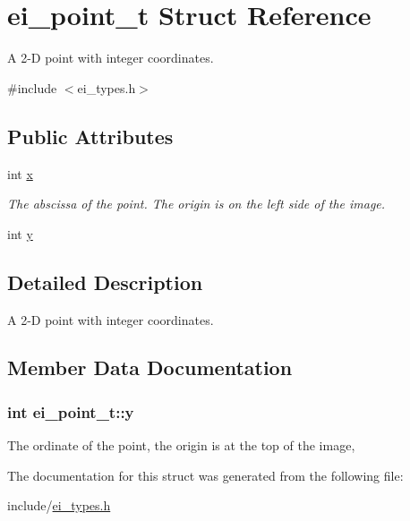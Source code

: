\hypertarget{structei__point__t}{}\section{ei\+\_\+point\+\_\+t Struct Reference}
\label{structei__point__t}


A 2-\/D point with integer coordinates.  




{\ttfamily \#include $<$ei\+\_\+types.\+h$>$}

\subsection*{Public Attributes}
\begin{DoxyCompactItemize}
\item 
int \hyperlink{structei__point__t_a6ec4a8846bae4b9694506dae039047b3}{x}\hypertarget{structei__point__t_a6ec4a8846bae4b9694506dae039047b3}{}\label{structei__point__t_a6ec4a8846bae4b9694506dae039047b3}

\begin{DoxyCompactList}\small\item\em The abscissa of the point. The origin is on the left side of the image. \end{DoxyCompactList}\item 
int \hyperlink{structei__point__t_a0c0f1bfa95c372595c52522877f556a0}{y}
\end{DoxyCompactItemize}


\subsection{Detailed Description}
A 2-\/D point with integer coordinates. 

\subsection{Member Data Documentation}
\subsubsection[{\texorpdfstring{y}{y}}]{\setlength{\rightskip}{0pt plus 5cm}int ei\+\_\+point\+\_\+t\+::y}\hypertarget{structei__point__t_a0c0f1bfa95c372595c52522877f556a0}{}\label{structei__point__t_a0c0f1bfa95c372595c52522877f556a0}
The ordinate of the point, the origin is at the top of the image, 

The documentation for this struct was generated from the following file\+:\begin{DoxyCompactItemize}
\item 
include/\hyperlink{ei__types_8h}{ei\+\_\+types.\+h}\end{DoxyCompactItemize}
